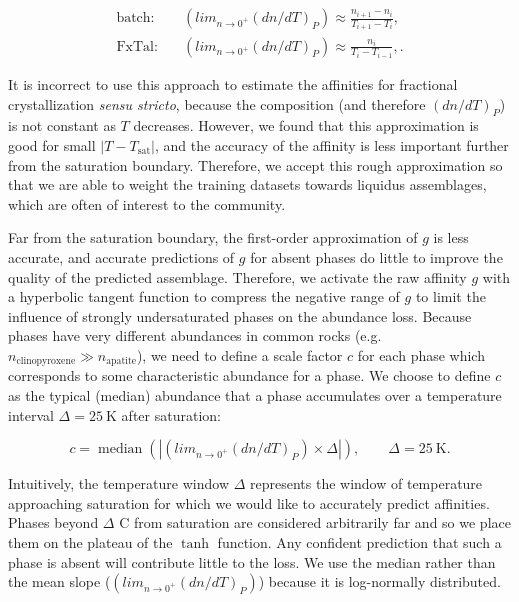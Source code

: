 \begin{align}
  \text{batch:}\quad & \left(lim_{n \to 0^+} (dn/dT)_P\right) \approx \frac{n_{i+1}-n_i}{T_{i+1} - T_i}, \label{eq:rbatch}\\
  \text{FxTal:}\quad & \left(lim_{n \to 0^+} (dn/dT)_P\right) \approx \frac{n_i}{T_{i} - T_{i-1}}, \label{eq:rfx} .
\end{align}

It is incorrect to use this approach to estimate the affinities for fractional crystallization \emph{sensu stricto}, because the composition (and therefore $(dn/dT)_P$) is not constant as $T$ decreases. 
However, we found that this approximation is good for small $|T-T_{\text{sat}}|$, and the accuracy of the affinity is less important further from the saturation boundary. Therefore, we
accept this rough approximation so that we are able to weight the training datasets towards liquidus assemblages, which are often of interest to the community. 

Far from the saturation boundary, the first-order approximation of $g$ is less accurate, and accurate predictions of $g$ for absent phases do little to improve the quality of
the predicted assemblage. Therefore, we activate the raw affinity $g$ with a hyperbolic tangent function to compress the negative range of $g$ to limit the influence of strongly undersaturated phases 
on the abundance loss. Because phases have very different abundances in common rocks (e.g. $n_{\text{clinopyroxene}} \gg n_{\text{apatite}}$), we need to define
a scale factor $c$ for each phase which corresponds to some characteristic abundance for a phase. We choose to define $c$ as the typical (median) abundance that a
phase accumulates over a temperature interval $\Delta = 25~\text{K}$ after saturation:

\begin{equation}
  c = \operatorname{median}(| \left(lim_{n \to 0^+} (dn/dT)_P\right) \times \Delta |) , \qquad \Delta = 25~\text{K}.
  \label{eq:c}
\end{equation}

Intuitively, the temperature window $\Delta$ represents the window of temperature approaching saturation for which we would like to accurately predict affinities. 
Phases beyond $\Delta$ \textdegree C from saturation are considered arbitrarily far and so we place them on the plateau of the $\tanh$ function. Any confident prediction that
such a phase is absent will contribute little to the loss. We use the median rather than the mean slope ($\left(lim_{n \to 0^+} (dn/dT)_P\right)$) because it is 
log-normally distributed. 

